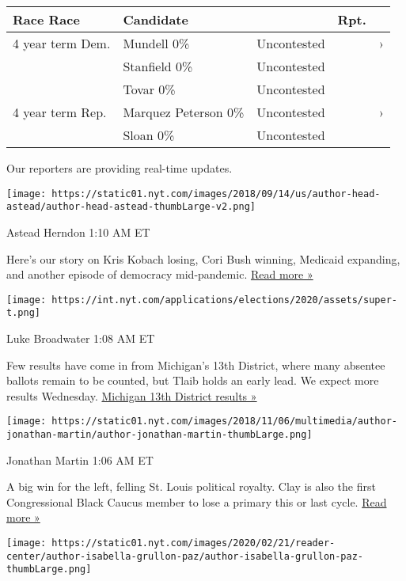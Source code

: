 \begin{longtable}[]{@{}lllll@{}}
\toprule
Race Race & Candidate & & Rpt. &\tabularnewline
\midrule
\endhead
4 year term Dem. & Mundell 0\% & Uncontested & & ›\tabularnewline
& Stanfield 0\% & Uncontested & &\tabularnewline
& Tovar 0\% & Uncontested & &\tabularnewline
4 year term Rep. & Marquez Peterson 0\% & Uncontested & &
›\tabularnewline
& Sloan 0\% & Uncontested & &\tabularnewline
\bottomrule
\end{longtable}

Our reporters are providing real-time updates.

\texttt{[image: https://static01.nyt.com/images/2018/09/14/us/author-head-astead/author-head-astead-thumbLarge-v2.png]}

Astead Herndon 1:10 AM ET

Here's our story on Kris Kobach losing, Cori Bush winning, Medicaid
expanding, and another episode of democracy mid-pandemic.
\href{https://www.nytimes.com/2020/08/04/us/politics/kobach-tlaib.html?action=click\&module=ELEX_results\&pgtype=Interactive\&region=ReporterUpdates}{Read
more »}

\texttt{[image: https://int.nyt.com/applications/elections/2020/assets/super-t.png]}

Luke Broadwater 1:08 AM ET

Few results have come in from Michigan's 13th District, where many
absentee ballots remain to be counted, but Tlaib holds an early lead. We
expect more results Wednesday.
\href{https://www.nytimes.com/interactive/2020/08/04/us/elections/results-michigan-house-district-13-primary-election.html?action=click\&module=ELEX_results\&pgtype=Interactive\&region=ReporterUpdates}{Michigan
13th District results »}

\texttt{[image: https://static01.nyt.com/images/2018/11/06/multimedia/author-jonathan-martin/author-jonathan-martin-thumbLarge.png]}

Jonathan Martin 1:06 AM ET

A big win for the left, felling St. Louis political royalty. Clay is
also the first Congressional Black Caucus member to lose a primary this
or last cycle.
\href{https://www.nytimes.com/2020/08/05/us/politics/cori-bush-missouri-william-lacy-clay.html?action=click\&module=ELEX_results\&pgtype=Interactive\&region=ReporterUpdates}{Read
more »}

\texttt{[image: https://static01.nyt.com/images/2020/02/21/reader-center/author-isabella-grullon-paz/author-isabella-grullon-paz-thumbLarge.png]}

